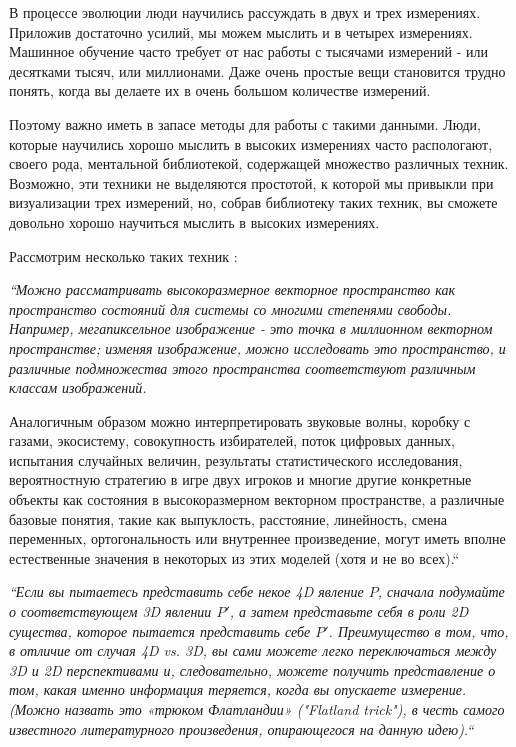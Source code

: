 В процессе эволюции люди научились рассуждать в двух и трех измерениях. 
Приложив достаточно усилий, мы можем мыслить и в четырех измерениях. 
Машинное обучение часто требует от нас работы с тысячами измерений - 
или десятками тысяч, или миллионами. Даже очень простые вещи становится 
трудно понять, когда вы делаете их в очень большом количестве измерений.

Поэтому важно иметь в запасе методы для работы с такими данными. 
Люди, которые научились хорошо мыслить в высоких измерениях часто 
распологают, своего рода, ментальной библиотекой, содержащей множество 
различных техник. Возможно, эти техники не выделяются простотой, 
к которой мы привыкли при визуализации трех измерений, но, 
собрав библиотеку таких техник, вы сможете довольно хорошо научиться 
мыслить в высоких измерениях.

Рассмотрим несколько таких техник \cite{ndim_thinking}:

\begin{quoting}
    \itshape
    “Можно рассматривать высокоразмерное векторное пространство как 
    пространство состояний для системы со многими степенями свободы. 
    Например, мегапиксельное изображение - это точка в миллионном 
    векторном пространстве; изменяя изображение, можно исследовать 
    это пространство, и различные подмножества этого пространства 
    соответствуют различным классам изображений.

    Аналогичным образом можно интерпретировать звуковые волны, 
    коробку с газами, экосистему, совокупность избирателей, поток 
    цифровых данных, испытания случайных величин, результаты 
    статистического исследования, вероятностную стратегию в игре 
    двух игроков и многие другие конкретные объекты как состояния 
    в высокоразмерном векторном пространстве, а различные базовые 
    понятия, такие как выпуклость, расстояние, линейность, смена 
    переменных, ортогональность или внутреннее произведение, могут 
    иметь вполне естественные значения в некоторых из этих моделей 
    (хотя и не во всех).“
\end{quoting}

\begin{quoting}
    \itshape
    “Если вы пытаетесь представить себе некое 4D явление $P$, 
    сначала подумайте о соответствующем 3D явлении $P'$, 
    а затем представьте себя в роли 2D существа, которое 
    пытается представить себе $P'$. Преимущество в том, что, в отличие 
    от случая 4D vs. 3D, вы сами можете легко переключаться между 3D 
    и 2D перспективами и, следовательно, можете получить представление 
    о том, какая именно информация теряется, когда вы опускаете измерение. 
    (Можно назвать это «трюком Флатландии» ("Flatland trick"), в честь самого 
    известного литературного произведения, опирающегося на данную идею).“
\end{quoting}

